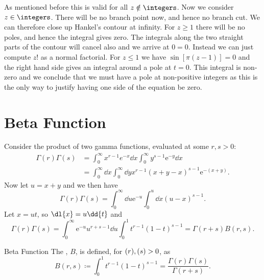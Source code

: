 \documentclass[fleqn]{NotesClass}
\newcommand*{\e}{\mathrm{e}}
\let\Re\relax
\DeclareMathOperator{\Re}{Re}
\begin{document}
    As mentioned before this is valid for all \(z \notin \integers\).
    Now we consider \(z \in \integers\).
    There will be no branch point now, and hence no branch cut.
    We can therefore close up Hankel's contour at infinity.
    For \(z \ge 1\) there will be no poles, and hence the integral gives zero.
    The integrals along the two straight parts of the contour will cancel also and we arrive at \(0 = 0\).
    Instead we can just compute \(z!\) as a normal factorial.
    For \(z \le 1\) we have \(\sin[\pi(z - 1)] = 0\) and the right hand side gives an integral around a pole at \(t = 0\).
    This integral is non-zero and we conclude that we must have a pole at non-positive integers as this is the only way to justify having one side of the equation be zero.
    
    \section{Beta Function}
    Consider the product of two gamma functions, evaluated at some \(r, s > 0\):
    \begin{align}
        \Gamma(r)\Gamma(s) &= \int_{0}^{\infty} x^{r-1}e^{-x}\dd{x} \int_{0}^{\infty} y^{s-1}\e^{-y}\dd{x}\\
        &= \int_{0}^{\infty} \dd{x} \int_{0}^{\infty} \dd{y} x^{r - 1}(x + y - x)^{s - 1}\e^{-(x + y)}.
    \end{align}
    Now let \(u = x + y\) and we then have
    \begin{equation}
        \Gamma(r) \Gamma(s) = \int_{0}^{\infty} \dd{u} \e^{-u} \int_{0}^{u} \dd{x} (u - x)^{s - 1}.
    \end{equation}
    Let \(x = ut\), so \(\dl{x} = u\dd{t}\) and
    \begin{equation}
        \Gamma(r) \Gamma(s) = \int_{0}^{\infty} \e^{-u} u^{r+s-1} \dd{u} \int_0^1 t^{r -1}(1 - t)^{s-1} = \Gamma(r + s) B(r, s).
    \end{equation}
    
    \begin{dfn}{Beta Function}{}
        The , \(B\), is defined, for \(\Re(r), \Re(s) > 0\), as
        \begin{equation}
            B(r, s) \coloneqq \int_0^1 t^{r - 1}(1 - t)^{s - 1} = \frac{\Gamma(r)\Gamma(s)}{\Gamma(r + s)}.
        \end{equation}
    \end{dfn}
    
\end{document}
